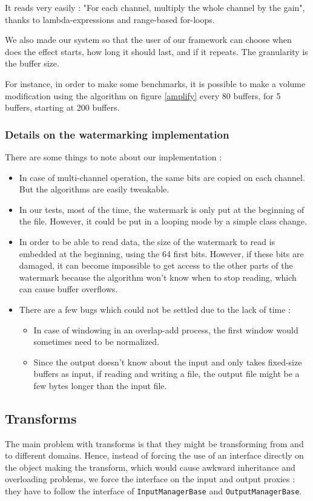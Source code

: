It reads very easily : "For each channel, multiply the whole channel by the gain", thanks to lambda-expressions and range-based for-loops.

We also made our system so that the user of our framework can choose when does the effect starts, how long it should last, and if it repeats. The granularity is the buffer size.

For instance, in order to make some benchmarks, it is possible to make a volume modification using the algorithm on figure \ref{amplify} every 80 buffers, for 5 buffers, starting at 200 buffers.
\subsubsection{Details on the watermarking implementation}
There are some things to note about our implementation : 
\begin{itemize}
\item In case of multi-channel operation, the same bits are copied on each channel. But the algorithms are easily tweakable.
\item In our tests, most of the time, the watermark is only put at the beginning of the file. However, it could be put in a looping mode by a simple class change.
\item In order to be able to read data, the size of the watermark to read is embedded at the beginning, using the 64 first bits. However, if these bits are damaged, it can become impossible to get access to the other parts of the watermark because the algorithm won't know when to stop reading, which can cause buffer overflows.
\item There are a few bugs which could not be settled due to the lack of time : 
\begin{itemize}
\item In case of windowing in an overlap-add process, the first window would sometimes need to be normalized.
\item Since the output doesn't know about the input and only takes fixed-size buffers as input, if reading and writing a file, the output file might be a few bytes longer than the input file.
\end{itemize}
\end{itemize}
\subsection{Transforms}
The main problem with transforms is that they might be transforming from and to different domains.
Hence, instead of forcing the use of an interface directly on the object making the transform, which would cause awkward inheritance and overloading problems, we force the interface on the input and output proxies : they have to follow the interface of \texttt{InputManagerBase} and \texttt{OutputManagerBase}.


